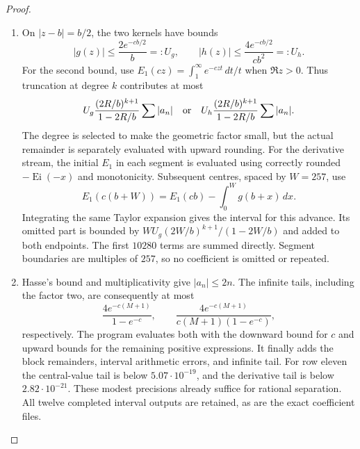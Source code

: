 \begin{proof}
\begin{enumerate}[label=\arabic*.,leftmargin=*]
\item On $|z-b|=b/2$, the two kernels have bounds
\[
 |g(z)|\leq\frac{2e^{-cb/2}}b=:U_g,
 \qquad
 |h(z)|\leq\frac{4e^{-cb/2}}{cb^2}=:U_h.
\]
For the second bound, use
$E_1(cz)=\int_1^\infty e^{-czt}\,dt/t$ when $\Re z>0$.
Thus truncation at degree $k$ contributes at most
\[
 U_g\frac{(2R/b)^{k+1}}{1-2R/b}\sum|a_n|
 \quad\hbox{or}\quad
 U_h\frac{(2R/b)^{k+1}}{1-2R/b}\sum|a_n|.
\]
The degree is selected to make the geometric factor small, but
the actual remainder is separately evaluated with upward rounding.
For the derivative stream, the initial $E_1$ in each segment is
evaluated using correctly rounded $-\operatorname{Ei}(-x)$ and
monotonicity. Subsequent centres, spaced by $W=257$, use
\[
 E_1(c(b+W))=E_1(cb)-\int_0^Wg(b+x)\,dx.
\]
Integrating the same Taylor expansion gives the interval for this
advance. Its omitted part is bounded by
$WU_g(2W/b)^{k+1}/(1-2W/b)$ and added to both endpoints.
The first $10280$ terms are summed directly. Segment boundaries
are multiples of $257$, so no coefficient is omitted or repeated.

\item Hasse's bound and multiplicativity give $|a_n|\leq2n$.
The infinite tails, including the factor two, are consequently at
most
\[
 \frac{4e^{-c(M+1)}}{1-e^{-c}},\qquad
 \frac{4e^{-c(M+1)}}{c(M+1)(1-e^{-c})},
\]
respectively. The program evaluates both with the downward bound
for $c$ and upward bounds for the remaining positive expressions.
It finally adds the block remainders, interval arithmetic errors,
and infinite tail. For row eleven the central-value tail is below
$5.07\cdot10^{-19}$, and the derivative tail is below
$2.82\cdot10^{-21}$. These modest precisions already suffice for
rational separation. All twelve completed interval outputs are
retained, as are the exact coefficient files.


\end{enumerate}
\end{proof}
